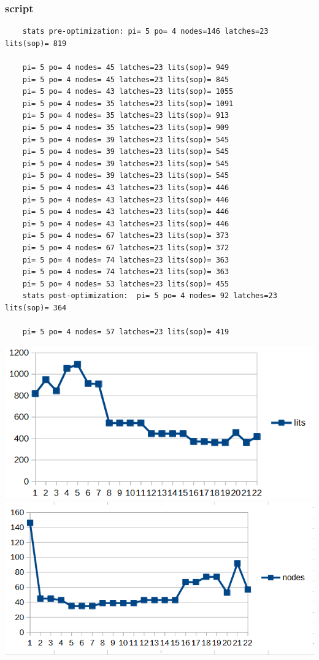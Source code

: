 \documentclass[a4paper,11pt]{article}
\begin{document}
\subsubsection{script}
    \begin{verbatim}
    stats pre-optimization: pi= 5 po= 4 nodes=146 latches=23 lits(sop)= 819
    
    pi= 5 po= 4 nodes= 45 latches=23 lits(sop)= 949
    pi= 5 po= 4 nodes= 45 latches=23 lits(sop)= 845
    pi= 5 po= 4 nodes= 43 latches=23 lits(sop)= 1055
    pi= 5 po= 4 nodes= 35 latches=23 lits(sop)= 1091
    pi= 5 po= 4 nodes= 35 latches=23 lits(sop)= 913
    pi= 5 po= 4 nodes= 35 latches=23 lits(sop)= 909
    pi= 5 po= 4 nodes= 39 latches=23 lits(sop)= 545
    pi= 5 po= 4 nodes= 39 latches=23 lits(sop)= 545
    pi= 5 po= 4 nodes= 39 latches=23 lits(sop)= 545
    pi= 5 po= 4 nodes= 39 latches=23 lits(sop)= 545
    pi= 5 po= 4 nodes= 43 latches=23 lits(sop)= 446
    pi= 5 po= 4 nodes= 43 latches=23 lits(sop)= 446
    pi= 5 po= 4 nodes= 43 latches=23 lits(sop)= 446
    pi= 5 po= 4 nodes= 43 latches=23 lits(sop)= 446
    pi= 5 po= 4 nodes= 67 latches=23 lits(sop)= 373
    pi= 5 po= 4 nodes= 67 latches=23 lits(sop)= 372
    pi= 5 po= 4 nodes= 74 latches=23 lits(sop)= 363
    pi= 5 po= 4 nodes= 74 latches=23 lits(sop)= 363
    pi= 5 po= 4 nodes= 53 latches=23 lits(sop)= 455
    stats post-optimization:  pi= 5 po= 4 nodes= 92 latches=23 lits(sop)= 364
    
    pi= 5 po= 4 nodes= 57 latches=23 lits(sop)= 419
    \end{verbatim}
    \begin{center}
        \includegraphics[width=0.6\linewidth]{assets/Charts/ScriptL.png}
        \includegraphics[width=0.6\linewidth]{assets/Charts/ScriptN.png}
    \end{center}
\end{document}
